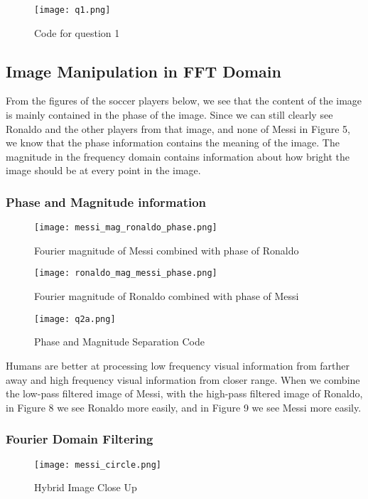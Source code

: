 \documentclass[12pt, letterpaper]{article}
\begin{document}
\begin{figure}[H]
    \centering
    \texttt{[image: q1.png]}
    \caption{Code for question 1}
    \label{fig:q1}
\end{figure}

\subsection{Image Manipulation in FFT Domain}

From the figures of the soccer players below, we see that the content of the image is mainly contained in the phase of the image. Since we can still clearly see Ronaldo and the other players from that image, and none of Messi in Figure 5, we know that the phase information contains the meaning of the image. The magnitude in the frequency domain contains information about how bright the image should be at every point in the image.

\subsubsection{Phase and Magnitude information}
\begin{figure}[H]
    \centering
    \texttt{[image: messi\_mag\_ronaldo\_phase.png]}
    \caption{Fourier magnitude of Messi combined with phase of Ronaldo}
\end{figure}

\begin{figure}[H]
    \centering
    \texttt{[image: ronaldo\_mag\_messi\_phase.png]}
    \caption{Fourier magnitude of Ronaldo combined with phase of Messi}
\end{figure}

\begin{figure}[H]
    \centering
    \texttt{[image: q2a.png]}
    \caption{Phase and Magnitude Separation Code}
\end{figure}

Humans are better at processing low frequency visual information from farther away and high frequency visual information from closer range. When we combine the low-pass filtered image of Messi, with the high-pass filtered image of Ronaldo, in Figure 8 we see Ronaldo more easily, and in Figure 9 we see Messi more easily.
\subsubsection{Fourier Domain Filtering}
\begin{figure}[H]
    \centering
    \texttt{[image: messi\_circle.png]}
    \caption{Hybrid Image Close Up}
\end{figure}
\end{document}
